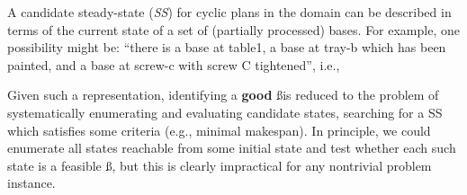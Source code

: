 
A candidate steady-state ({\em SS}) for cyclic plans in the \ca domain 
can be described in terms of the current state of a set of (partially processed) bases.
For example, one possibility might be: ``there is a base at table1, a base at tray-b which has been painted, and a base at screw-c with screw C tightened'', i.e., 


Given such a representation, 
identifying a \textbf{good} \ss is reduced to the problem of systematically enumerating and evaluating candidate states, searching for a SS which satisfies some criteria (e.g., minimal makespan).
%
In principle, we could enumerate all states reachable
from some initial state and test whether each such state is a feasible
\ss, but this is clearly impractical for any nontrivial
problem instance.

